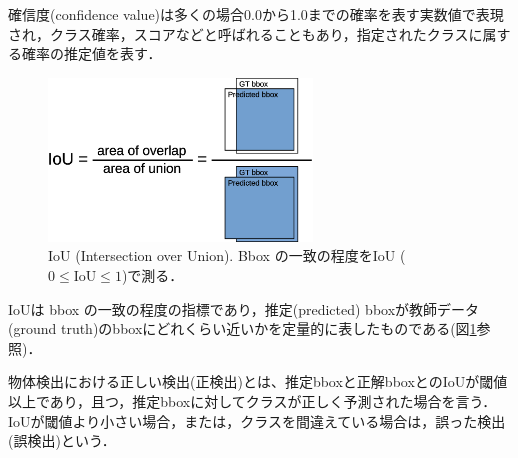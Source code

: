 \documentclass[twocolumn]{jsarticle} %
\begin{document}
確信度(confidence value)は多くの場合0.0から1.0までの確率を表す実数値で表現され，クラス確率，スコアなどと呼ばれることもあり，指定されたクラスに属する確率の推定値を表す．

\begin{figure}[tb]
    \centering
    \includegraphics[width=7cm,clip]{fig/IoU.eps}
    \caption{ IoU (Intersection over Union). Bbox の一致の程度をIoU ($0{\leq}\mbox{IoU}{\leq}1$)で測る．}
    \label{fig:IoU}
\end{figure}
IoUは bbox の一致の程度の指標であり，推定(predicted) bboxが教師データ(ground truth)のbboxにどれくらい近いかを定量的に表したものである(図\ref{fig:IoU}参照)．

物体検出における正しい検出(正検出)とは、推定bboxと正解bboxとのIoUが閾値以上であり，且つ，推定bboxに対してクラスが正しく予測された場合を言う．
IoUが閾値より小さい場合，または，クラスを間違えている場合は，誤った検出(誤検出)という．
\end{document}
